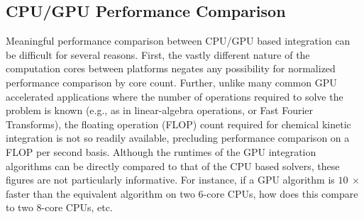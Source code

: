 \documentclass[final,twocolumn]{elsarticle}
\begin{document}

\subsection{CPU\slash GPU Performance Comparison}
Meaningful performance comparison between CPU\slash GPU based integration can be difficult for several reasons.
First, the vastly different nature of the computation cores between platforms negates any possibility for normalized performance comparison by core count.
Further, unlike many common GPU accelerated applications where the number of operations required to solve the problem is known (e.g., as in linear-algebra operations, or Fast Fourier Transforms), the floating operation (FLOP) count required for chemical kinetic integration is not so readily available, precluding performance comparison on a FLOP per second basis.
Although the runtimes of the GPU integration algorithms can be directly compared to that of the CPU based solvers, these figures are not particularly informative.
For instance, if a GPU algorithm is $\SI{10}{\times}$ faster than the equivalent algorithm on two 6-core CPUs, how does this compare to two 8-core CPUs, etc.
\end{document}
